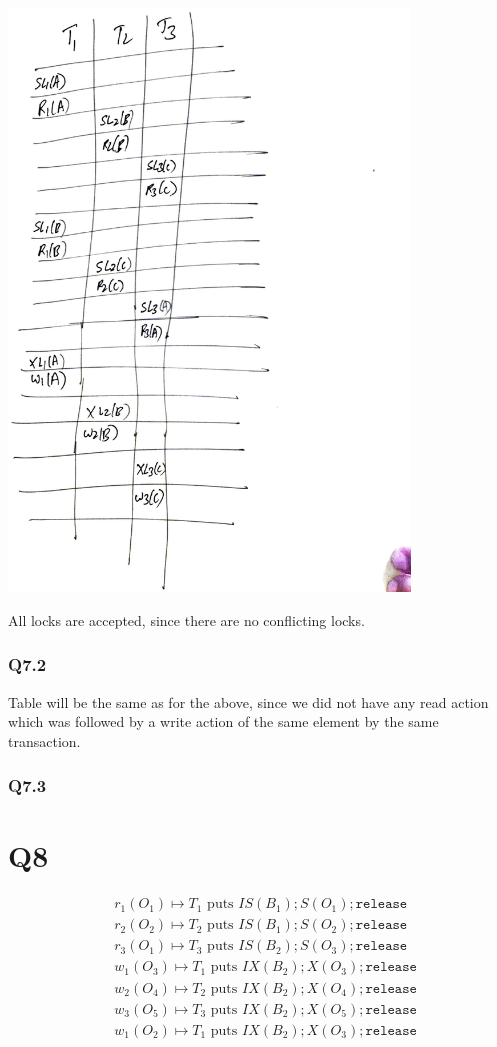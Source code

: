 \documentclass{article}
\begin{document}
\includegraphics[width=0.8\textwidth]{db-q71.pdf}

All locks are accepted, since there are no conflicting locks.

\subsubsection{Q7.2}

Table will be the same as for the above, since we did not have any read action
which was followed by a write action of the same element by the same
transaction.


\subsubsection{Q7.3}


\section{Q8}
\begin{align*}
    &r_1(O_1) \mapsto \text{$T_1$ puts }IS(B_1); S(O_1); \texttt{release} \\
    &r_2(O_2) \mapsto \text{$T_2$ puts }IS(B_1); S(O_2); \texttt{release}\\
    &r_3(O_1) \mapsto \text{$T_3$ puts }IS(B_2); S(O_3); \texttt{release}\\
    &w_1(O_3) \mapsto \text{$T_1$ puts }IX(B_2); X(O_3); \texttt{release}\\
    &w_2(O_4) \mapsto \text{$T_2$ puts }IX(B_2); X(O_4); \texttt{release}\\
    &w_3(O_5) \mapsto \text{$T_3$ puts }IX(B_2); X(O_5); \texttt{release}\\
    &w_1(O_2) \mapsto \text{$T_1$ puts }IX(B_2); X(O_3); \texttt{release}\\
\end{align*}
\end{document}
